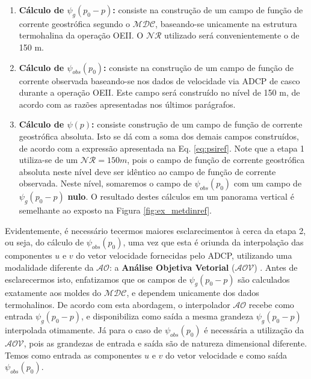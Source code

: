 \documentclass[12pt,portuguese,a4paper,pdftex]{article}
\begin{document}
\begin{enumerate}

 \item {\bf Cálculo de $\psi_g(p_0-p)$:} consiste na construção de um campo de função de corrente
geostrófica segundo o $\mathcal{MDC}$, baseando-se unicamente na estrutura termohalina da operação OEII. 
O $\mathcal{NR}$ utilizado será convenientemente o de 150 m.
 
 \item {\bf Cálculo de $\psi_{obs}(p_0)$:} consiste na construção de um campo de função de corrente
observada baseando-se nos dados de velocidade via ADCP de casco durante a operação OEII. Este
campo será construído no nível de 150 m, de acordo com as razões apresentadas nos últimos parágrafos. 

 \item {\bf Cálculo de $\psi(p)$:} consiste construção de um campo de função de corrente geostrófica
absoluta. Isto se dá com a soma dos demais campos construídos, de acordo com a expressão
apresentada na Eq. \ref{eq:psiref}. Note que a etapa 1 utiliza-se de um $\mathcal{NR} = 150 m$, pois o campo
de função de corrente geostrófica absoluta neste nível deve ser idêntico ao campo de função de corrente
observada. Neste nível, somaremos o campo de $\psi_{obs}(p_0)$ com um campo de $\psi_g(p_0-p)$ {\bf nulo}. 
O resultado destes cálculos em um panorama vertical é semelhante ao exposto na Figura \ref{fig:ex_metdinref}.

\end{enumerate}

\vspace{1cm}

Evidentemente, é necessário tecermos maiores esclarecimentos à cerca da etapa 2, ou seja, do cálculo 
de $\psi_{obs}(p_0)$, uma vez que 
esta é oriunda da interpolação das componentes $u$ e $v$ do vetor velocidade fornecidas pelo ADCP, utilizando uma 
modalidade diferente da $\mathcal{AO}$: a {\bf Análise Objetiva Vetorial} ($\mathcal{AOV}$) \citep{bretherton_etal1976}.
Antes de esclarecermos
isto, enfatizamos que os campos de $\psi_g(p_0-p)$ são calculados exatamente aos moldes do $\mathcal{MDC}$, e dependem unicamente dos dados termohalinos. De acordo com esta abordagem, o interpolador $\mathcal{AO}$
recebe como entrada $\psi_g(p_0-p)$, e disponibiliza
como saída a mesma grandeza $\psi_g(p_0-p)$ interpolada otimamente. Já para o caso de $\psi_{obs}(p_0)$ é necessária
a utilização da $\mathcal{AOV}$, pois as grandezas de entrada e saída são de natureza dimensional diferente. Temos
como entrada as componentes $u$ e $v$ do vetor velocidade e como saída $\psi_{obs}(p_0)$.
\end{document}
